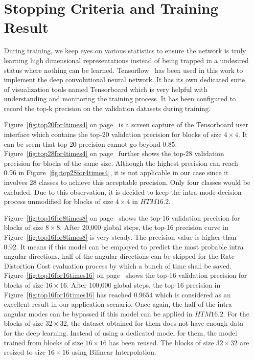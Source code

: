 \section{Stopping Criteria and Training Result}\label{sec:training}
During training, we keep eyes on 
various statistics to ensure the network is
truly learning high dimensional representations 
instead of being trapped
in a undesired status where nothing can be
learned.
Tensorflow~\parencite{tensorflow2015-whitepaper} has 
been used in this work to implement the 
deep convolutional neural network.
It has its own dedicated suite of visualization
tools named Tensorboard which is very helpful 
with understanding and monitoring the training process.
It has been configured to record the top-k precision
on the validation datasets during training.

Figure~\ref{fig:top20for4times4} 
on page~\pageref{fig:top20for4times4}
is a screen capture
of the Tensorboard user interface which contains the 
top-20 validation precision for blocks of size \(4\times4\).
It can be seem that top-20 precision cannot go 
beyond \(0.85\).
Figure~\ref{fig:top28for4times4}
on page~\pageref{fig:top28for4times4}
further shows the 
top-28 validation precision for blocks of the same size.
Although the highest precision can reach \(0.96\) 
in Figure~\ref{fig:top28for4times4}, it is not applicable
in our case since it involves 28 classes to achieve this 
acceptable precision.
Only four classes would be excluded.
Due to this observation, it is decided to
keep the intra mode decision process unmodified for 
blocks of size \(4\times4\) in \(HTM16.2\).

Figure~\ref{fig:top16for8times8}
on page~\pageref{fig:top16for8times8}
shows the 
top-16 validation precision for blocks of size \(8\times8\).
After 20,000 global steps, the top-16 precision curve in 
Figure~\ref{fig:top16for8times8} is very steady.
The precision value is higher than \(0.92\).
It means if this model can be employed to predict the 
most probable intra angular directions,
half of the angular directions can be skipped for
the Rate Distortion Cost evaluation process by which
a bunch of time shall be saved.
Figure~\ref{fig:top16for16times16} 
on page~\pageref{fig:top16for16times16}
shows the
top-16 validation precision for blocks 
of size \(16\times16\).
After 100,000 global steps, the top-16 precision in
Figure~\ref{fig:top16for16times16} has reached
\(0.9654\) which is considered as an excellent
result in our application scenario.
Once again, the half of the intra angular modes
can be bypassed if this model can be applied 
in \(HTM16.2\).
For the blocks of size \(32\times32\),
the dataset obtained for them does not 
have enough data
for the deep learning.
Instead of using a dedicated model for them,
the model trained from blocks of 
size \(16\times16\) has been reused.
The blocks of size \(32\times32\) are resized
to size \(16\times16\) using Bilinear Interpolation.

